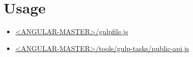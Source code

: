 \section{Usage}


\begin{itemize}
  \item \href{https://github.com/angular/angular/blob/master/gulpfile.js}
        {<ANGULAR-MASTER>/gulpfile.js}
\end{itemize}





\begin{itemize}
  \item \href{https://github.com/angular/angular/blob/master/tools/gulp-tasks/public-api.js}
        {<ANGULAR-MASTER>/tools/gulp-tasks/public-api.js}
\end{itemize}



